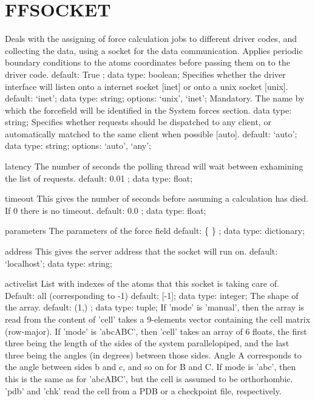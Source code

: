 \section{FFSOCKET}
\label{FFSOCKET}
\begin{ipifield}{}%
{Deals with the assigning of force calculation jobs to different driver codes, and collecting the data, using a socket for the data communication.}%
{}%
{%
{Applies periodic boundary conditions to the atoms coordinates before passing them on to the driver code.}%
{default:  True ; data type: boolean; }%
%
{Specifies whether the driver interface will listen onto a internet socket [inet] or onto a unix socket [unix].}%
{default: `inet'; data type: string; options: `unix', `inet'; }%
%
{Mandatory. The name by which the forcefield will be identified in the System forces section.}%
{data type: string; }%
%
{Specifies whether requests should be dispatched to any client, or automatically matched to the same client when possible [auto].}%
{default: `auto'; data type: string; options: `auto', `any'; }%
}
\begin{ipifield}{latency}%
{The number of seconds the polling thread will wait between exhamining the list of requests.}%
{default:  0.01 ; data type: float; }%
{}
\end{ipifield}
\begin{ipifield}{timeout}%
{This gives the number of seconds before assuming a calculation has died. If 0 there is no timeout.}%
{default:  0.0 ; data type: float; }%
{}
\end{ipifield}
\begin{ipifield}{parameters}%
{The parameters of the force field}%
{default:  \{ \} ; data type: dictionary; }%
{}
\end{ipifield}
\begin{ipifield}{address}%
{This gives the server address that the socket will run on.}%
{default: `localhost'; data type: string; }%
{}
\end{ipifield}
\begin{ipifield}{activelist}%
{List with indexes of the atoms that this socket is taking care of.    Default: all (corresponding to -1)}%
{default: 
      [-1]; data type: integer; }%
{%
{The shape of the array.}%
{default:  (1,) ; data type: tuple; }%
%
{If 'mode' is 'manual', then the array is read from the content of 'cell' takes a 9-elements vector containing the cell matrix (row-major). If 'mode' is 'abcABC', then 'cell' takes an array of 6 floats, the first three being the length of the sides of the system parallelopiped, and the last three being the angles (in degrees) between those sides. Angle A corresponds to the angle between sides b and c, and so on for B and C. If mode is 'abc', then this is the same as for 'abcABC', but the cell is assumed to be orthorhombic. 'pdb' and 'chk' read the cell from a PDB or a checkpoint file, respectively.}%
}
\end{ipifield}
\end{ipifield}
